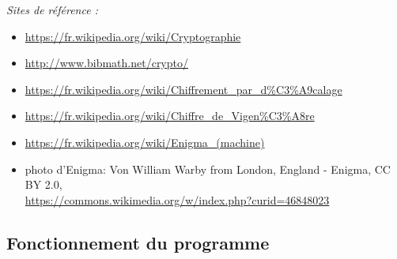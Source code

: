 \documentclass[a4paper,12pt,abstracton,titlepage]{scrartcl}
\begin{document}
\textit{Sites de référence :}
\begin{itemize}
\item \url{https://fr.wikipedia.org/wiki/Cryptographie}
\item \url{http://www.bibmath.net/crypto/}
\item \url{https://fr.wikipedia.org/wiki/Chiffrement_par_d\%C3\%A9calage}
\item \url{https://fr.wikipedia.org/wiki/Chiffre_de_Vigen\%C3\%A8re}
\item \url{https://fr.wikipedia.org/wiki/Enigma_(machine)}
\item photo d’Enigma:
Von William Warby from London, England - Enigma, CC BY 2.0,\\\url{https://commons.wikimedia.org/w/index.php?curid=46848023}\\
\end{itemize}

\newpage
\subsection{Fonctionnement du programme}
\end{document}
